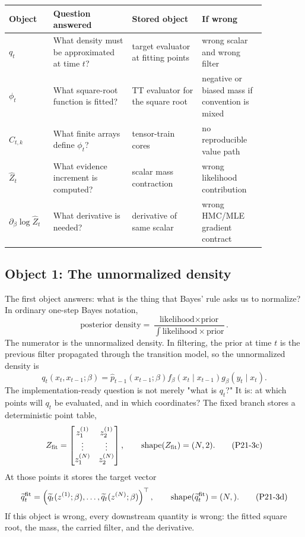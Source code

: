 \documentclass[11pt]{article}
\newcommand{\widehatZ}{\widehat Z}
\newcommand{\shape}{\operatorname{shape}}
\begin{document}
\begin{center}
\begin{tabular}{p{0.13\linewidth}p{0.27\linewidth}p{0.24\linewidth}p{0.22\linewidth}}
\toprule
Object & Question answered & Stored object & If wrong \\
\midrule
\(q_t\) & What density must be approximated at time \(t\)? & target evaluator at fitting points & wrong scalar and wrong filter \\
\(\phi_t\) & What square-root function is fitted? & TT evaluator for the square root & negative or biased mass if convention is mixed \\
\(C_{t,k}\) & What finite arrays define \(\phi_t\)? & tensor-train cores & no reproducible value path \\
\(\widehatZ_t\) & What evidence increment is computed? & scalar mass contraction & wrong likelihood contribution \\
\(\partial_\beta\log\widehatZ_t\) & What derivative is needed? & derivative of same scalar & wrong HMC/MLE gradient contract \\
\bottomrule
\end{tabular}
\end{center}

\subsection{Object 1: The unnormalized density}

The first object answers: what is the thing that Bayes' rule asks us to
normalize?  In ordinary one-step Bayes notation,
\[
    \text{posterior density}
    =
    \frac{\text{likelihood}\times\text{prior}}
    {\int \text{likelihood}\times\text{prior}}.
    \tag{P21-3a}
\]
The numerator is the unnormalized density.  In filtering, the prior at time
\(t\) is the previous filter propagated through the transition model, so the
unnormalized density is
\[
    q_t(x_t,x_{t-1};\beta)
    =
    \widehat p_{t-1}(x_{t-1};\beta)
    f_\beta(x_t\mid x_{t-1})
    g_\beta(y_t\mid x_t).
    \tag{P21-3b}
\]
The implementation-ready question is not merely "what is \(q_t\)?"  It is:
at which points will \(q_t\) be evaluated, and in which coordinates?  The
fixed branch stores a deterministic point table,
\[
    Z_{\rm fit}
    =
    \begin{bmatrix}
    z_1^{(1)} & z_2^{(1)}\\
    \vdots & \vdots\\
    z_1^{(N)} & z_2^{(N)}
    \end{bmatrix},
    \qquad
    \shape(Z_{\rm fit})=(N,2).
    \tag{P21-3c}
\]
At those points it stores the target vector
\[
    \widetilde q_t^{\rm fit}
    =
    \left(
    \widetilde q_t(z^{(1)};\beta),\ldots,
    \widetilde q_t(z^{(N)};\beta)
    \right)^\top,
    \qquad
    \shape(\widetilde q_t^{\rm fit})=(N,).
    \tag{P21-3d}
\]
If this object is wrong, every downstream quantity is wrong: the fitted square
root, the mass, the carried filter, and the derivative.
\end{document}

